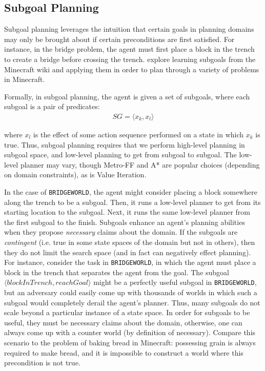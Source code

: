 \documentclass[]{article}
\begin{document}



\subsection{Subgoal Planning}
\label{sec:subgoals}

Subgoal planning leverages the intuition that certain goals in
planning domains may only be brought about if certain preconditions
are first satisfied. For instance, in the bridge problem, the agent must
first place a block in the trench to create a bridge before crossing
the trench.  \citet{branavan12a} explore learning subgoals from the
Minecraft wiki and applying them in order to plan through a variety of
problems in Minecraft.

Formally, in subgoal planning, the agent is given a set of subgoals, where each subgoal is a pair of predicates:
\begin{align}
SG = \langle x_k, x_l \rangle
\end{align}

where $x_l$ is the effect of some action sequence performed on 
a state in which $x_k$ is true. Thus, subgoal planning requires 
that we perform high-level planning in subgoal space, and low-level 
planning to get from subgoal to subgoal. The low-level planner may vary, though
Metro-FF and A* are popular choices (depending on domain constraints), as is Value Iteration.

In the case of \texttt{BRIDGEWORLD}, the agent might consider placing
a block somewhere along the trench to be a subgoal. Then, it runs
a low-level planner to get from its starting location to the subgoal.
Next, it runs the same low-level planner from the first subgoal to the finish.
Subgoals enhance an agent's planning abilities when they propose {\it
  necessary} claims about the domain. If the subgoals are {\it
  contingent} (i.e. true in some state spaces of the domain but not in
others), then they do not limit the search space (and in fact can negatively 
effect planning). For instance, consider the task in \texttt{BRIDGEWORLD}, 
in which the agent must place a block in the trench that separates the agent 
from the goal. The subgoal $\langle blockInTrench, reachGoal\rangle$ might be a
perfectly useful subgoal in \texttt{BRIDGEWORLD}, but an adversary
could easily come up with thousands of worlds in which such a subgoal
would completely derail the agent's planner. Thus, many subgoals do
not scale beyond a particular instance of a state space. In order for
subgoals to be useful, they must be necessary claims about the domain,
otherwise, one can always come up with a counter world (by definition
of necessary).  Compare this scenario to the problem of baking bread
in Minecraft: possessing grain is always required to make bread, and it
is impossible to construct a world where this precondition is not
true.
\end{document}
